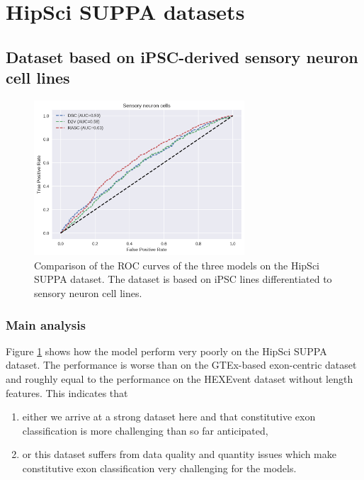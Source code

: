 



\section{HipSci SUPPA datasets} \label{subsec:hipsci_suppa}
\subsection{Dataset based on iPSC-derived sensory neuron cell lines}

\begin{figure}
	\centering\includegraphics[width=0.7\textwidth]{../visualizations/ch5-results/suppa_cross_model_roc_auc_comparison.png} 
	\caption{Comparison of the ROC curves of the three models on the HipSci SUPPA dataset. The dataset is based on iPSC lines differentiated to sensory neuron cell lines. }
	\label{fig:suppa_auc_roc}
\end{figure}
\subsubsection{Main analysis}
Figure \ref{fig:suppa_auc_roc} shows how the model perform very poorly on the HipSci SUPPA dataset. The performance is worse than on the GTEx-based exon-centric dataset and roughly equal to the performance on the HEXEvent dataset without length features. This indicates that 
\begin{enumerate}
	\item either we arrive at a strong dataset here and that constitutive exon classification is more challenging than so far anticipated,
	\item or this dataset suffers from data quality and quantity issues which make constitutive exon classification very challenging for the models.
\end{enumerate}

